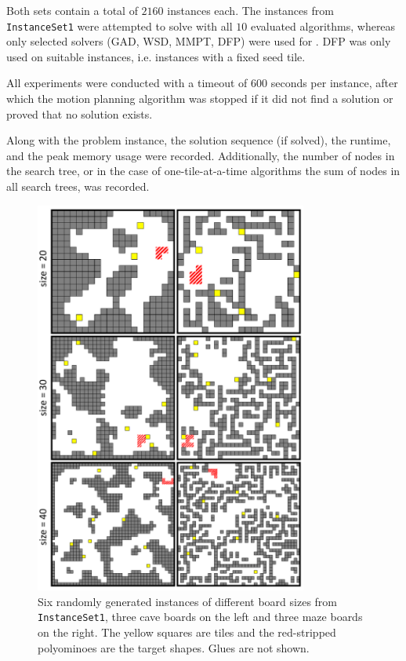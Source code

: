 \par

Both sets contain a total of $2160$ instances each. The instances from \texttt{InstanceSet1} were attempted to solve with all $10$ evaluated algorithms, whereas only selected solvers (GAD, WSD, MMPT, DFP) were used for . DFP was only used on suitable instances, i.e. instances with a fixed seed tile. \par
All experiments were conducted with a timeout of 600 seconds per instance, after which the motion planning algorithm was stopped if it did not find a solution or proved that no solution exists.\par
Along with the problem instance, the solution sequence (if solved), the runtime, and the peak memory usage were recorded. Additionally, the number of nodes in the search tree, or in the case of one-tile-at-a-time algorithms the sum of nodes in all search trees, was recorded.

\begin{figure}[h]
\centering
\includegraphics[width=0.8\textwidth]{figures/example_boards/exampleboards_annotated.pdf}
\caption [Runtime comparison by problem type for GAD] {Six randomly generated instances of different board sizes from \texttt{InstanceSet1}, three cave boards on the left and three maze boards on the right. The yellow squares are tiles and the red-stripped polyominoes are the target shapes. Glues are not shown.}
\label{fig:example_boards}
\end{figure}



